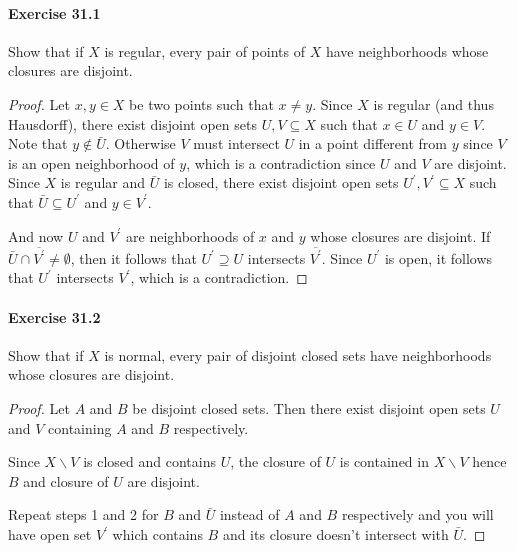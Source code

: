 \documentclass{article}
\begin{document}
\paragraph{Exercise 31.1} Show that if $X$ is regular, every pair of points of $X$ have neighborhoods whose closures are disjoint.
\begin{proof}
    Let $x, y \in X$ be two points such that $x \neq y$. Since $X$ is regular (and thus Hausdorff), there exist disjoint open sets $U, V \subseteq X$ such that $x \in U$ and $y \in V$.
Note that $y \notin \bar{U}$. Otherwise $V$ must intersect $U$ in a point different from $y$ since $V$ is an open neighborhood of $y$, which is a contradiction since $U$ and $V$ are disjoint.
Since $X$ is regular and $\bar{U}$ is closed, there exist disjoint open sets $U^{\prime}, V^{\prime} \subseteq X$ such that $\bar{U} \subseteq U^{\prime}$ and $y \in V^{\prime}$.

And now $U$ and $V^{\prime}$ are neighborhoods of $x$ and $y$ whose closures are disjoint. If $\bar{U} \cap \overline{V^{\prime}} \neq \emptyset$, then it follows that $U^{\prime} \supseteq U$ intersects $\overline{V^{\prime}}$. Since $U^{\prime}$ is open, it follows that $U^{\prime}$ intersects $V^{\prime}$, which is a contradiction.
\end{proof}



\paragraph{Exercise 31.2} Show that if $X$ is normal, every pair of disjoint closed sets have neighborhoods whose closures are disjoint.
\begin{proof}
    Let $A$ and $B$ be disjoint closed sets. Then there exist disjoint open sets $U$ and $V$ containing $A$ and $B$ respectively.

Since $X \backslash V$ is closed and contains $U$, the closure of $U$ is contained in $X \backslash V$ hence $B$ and closure of $U$ are disjoint.

Repeat steps 1 and 2 for $B$ and $\bar{U}$ instead of $A$ and $B$ respectively and you will have open set $V^{\prime}$ which contains $B$ and its closure doesn't intersect with $\bar{U}$.
\end{proof}
\end{document}
